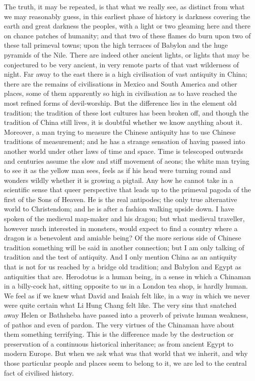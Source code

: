 The truth, it may be repeated, is that what we really see, as distinct from what we may reasonably guess, in this earliest phase of history is darkness covering the earth and great darkness the peoples, with a light or two gleaming here and there on chance patches of humanity; and that two of these flames do burn upon two of these tall primeval towns; upon the high terraces of Babylon and the huge pyramids of the Nile. There are indeed other ancient lights, or lights that may be conjectured to be very ancient, in very remote parts of that vast wilderness of night. Far away to the east there is a high civilisation of vast antiquity in China; there are the remains of civilisations in Mexico and South America and other places, some of them apparently so high in civilisation as to have reached the most refined forms of devil-worship. But the difference lies in the element old tradition; the tradition of these lost cultures has been broken off, and though the tradition of China still lives, it is doubtful whether we know anything about it. Moreover, a man trying to measure the Chinese antiquity has to use Chinese traditions of measurement; and he has a strange sensation of having passed into another world under other laws of time and space. Time is telescoped outwards and centuries assume the slow and stiff movement of aeons; the white man trying to see it as the yellow man sees, feels as if his head were turning round and wonders wildly whether it is growing a pigtail. Any how he cannot take in a scientific sense that queer perspective that leads up to the primeval pagoda of the first of the Sons of Heaven. He is the real antipodes; the only true alternative world to Christendom; and he is after a fashion walking upside down. I have spoken of the medieval map-maker and his dragon; but what medieval traveller, however much interested in monsters, would expect to find a country where a dragon is a benevolent and amiable being? Of the more serious side of Chinese tradition something will be said in another connection; but I am only talking of tradition and the test of antiquity. And I only mention China as an antiquity that is not for us reached by a bridge old tradition; and Babylon and Egypt as antiquities that are. Herodotus is a human being, in a sense in which a Chinaman in a billy-cock hat, sitting opposite to us in a London tea shop, is hardly human. We feel as if we knew what David and Isaiah felt like, in a way in which we never were quite certain what Li Hung Chang felt like. The very sins that snatched away Helen or Bathsheba have passed into a proverb of private human weakness, of pathos and even of pardon. The very virtues of the Chinaman have about them something terrifying. This is the difference made by the destruction or preservation of a continuous historical inheritance; as from ancient Egypt to modern Europe. But when we ask what was that world that we inherit, and why those particular people and places seem to belong to it, we are led to the central fact of civilised history.

